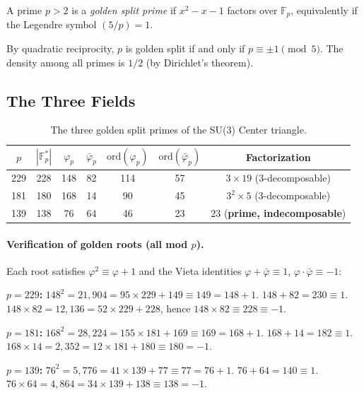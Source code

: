 \begin{definition}
\label{def:golden}
A prime $p > 2$ is a \emph{golden split prime} if $x^2 - x - 1$
factors over $\mathbb{F}_p$, equivalently if the Legendre symbol
$(5/p) = 1$.
\end{definition}

By quadratic reciprocity, $p$ is golden split if and only if
$p \equiv \pm 1 \pmod{5}$. The density among all primes is $1/2$
(by Dirichlet's theorem).

\subsection{The Three Fields}

\begin{table}[h]
\centering
\caption{The three golden split primes of the SU(3) Center triangle.}
\label{tab:fields}
\begin{tabular}{@{}ccccccc@{}}
\toprule
$p$ & $|{\mathbb{F}_p^*}|$ & $\varphi_p$ & $\bar\varphi_p$
    & $\mathrm{ord}(\varphi_p)$ & $\mathrm{ord}(\bar\varphi_p)$
    & Factorization \\
\midrule
229 & 228 & 148 & 82  & 114 & 57  & $3 \times 19$ (3-decomposable) \\
181 & 180 & 168 & 14  &  90 & 45  & $3^2 \times 5$ (3-decomposable) \\
139 & 138 &  76 & 64  &  46 & 23  & $23$ (\textbf{prime, indecomposable}) \\
\bottomrule
\end{tabular}
\end{table}

\paragraph{Verification of golden roots (all mod $p$).}
Each root satisfies $\varphi^2 \equiv \varphi + 1$ and the Vieta identities
$\varphi + \bar\varphi \equiv 1$, $\varphi \cdot \bar\varphi \equiv -1$:

\medskip
\noindent\textbf{$p = 229$:}
$148^2 = 21{,}904 = 95 \times 229 + 149 \equiv 149 = 148 + 1$.
$148 + 82 = 230 \equiv 1$.
$148 \times 82 = 12{,}136 = 52 \times 229 + 228$,
hence $148 \times 82 \equiv 228 \equiv -1$.

\medskip
\noindent\textbf{$p = 181$:}
$168^2 = 28{,}224 = 155 \times 181 + 169 \equiv 169 = 168 + 1$.
$168 + 14 = 182 \equiv 1$.
$168 \times 14 = 2{,}352 = 12 \times 181 + 180 \equiv 180 = -1$.

\medskip
\noindent\textbf{$p = 139$:}
$76^2 = 5{,}776 = 41 \times 139 + 77 \equiv 77 = 76 + 1$.
$76 + 64 = 140 \equiv 1$.
$76 \times 64 = 4{,}864 = 34 \times 139 + 138 \equiv 138 = -1$.

